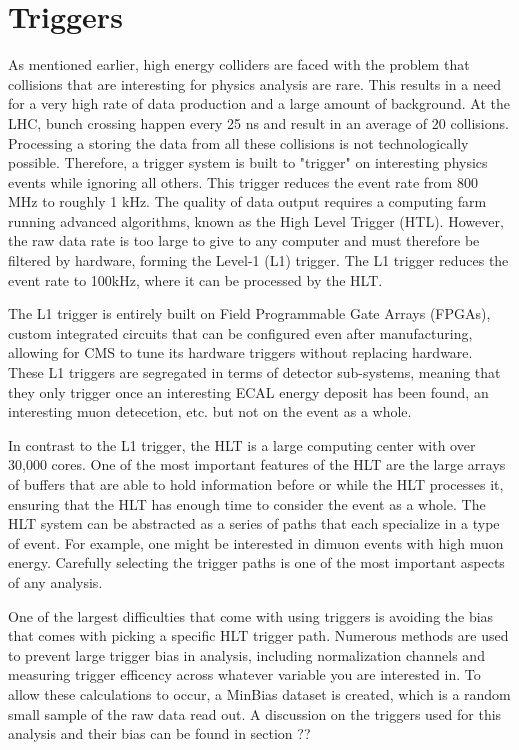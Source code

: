 \section{Triggers}
\label{sec:triggers}

As mentioned earlier, high energy colliders are faced with the problem that collisions that are interesting for physics analysis are rare. This results in a need for a very high rate of data production and a large amount of background. 
At the LHC, bunch crossing happen every 25 ns and result in an average of 20 collisions. Processing a storing the data from all these collisions is not technologically possible. Therefore, a trigger system is built to "trigger" on interesting physics events while ignoring all others. This trigger reduces the event rate from 800 MHz to roughly 1 kHz. The quality of data output requires a computing farm running advanced algorithms, known as the High Level Trigger (HTL). However, the raw data rate is too large to give to any computer and must therefore be filtered by hardware, forming the Level-1 (L1) trigger. The L1 trigger reduces the event rate to 100kHz, where it can be processed by the HLT. %

The L1 trigger is entirely built on Field Programmable Gate Arrays (FPGAs), custom integrated circuits that can be configured even after manufacturing, allowing for CMS to tune its hardware triggers without replacing hardware. These L1 triggers are segregated in terms of detector sub-systems, meaning that they only trigger once an interesting ECAL energy deposit has been found, an interesting muon detecetion, etc. but not on the event as a whole. 

In contrast to the L1 trigger, the HLT is a large computing center with over 30,000 cores. One of the most important features of the HLT are the large arrays of buffers that are able to hold information before or while the HLT processes it, ensuring that the HLT has enough time to consider the event as a whole. The HLT system can be abstracted as a series of paths that each specialize in a type of event. For example, one might be interested in dimuon events with high muon energy. Carefully selecting the trigger paths is one of the most important aspects of any analysis. 

One of the largest difficulties that come with using triggers is avoiding the bias that comes with picking a specific HLT trigger path. Numerous methods are used to prevent large trigger bias in analysis, including normalization channels and measuring trigger efficency across whatever variable you are interested in. To allow these calculations to occur, a MinBias dataset is created, which is a random small sample of the raw data read out. A discussion on the triggers used for this analysis and their bias can be found in section ??%

